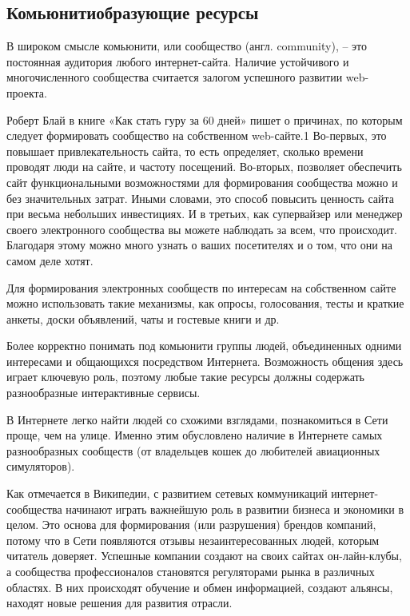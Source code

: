 \documentclass[a4paper,english,russian]{G2-105}
\begin{document}
\subsection{Комьюнитиобразующие ресурсы}
\par В широком смысле комьюнити, или сообщество (англ. community),  – это постоянная аудитория любого интернет-сайта. Наличие устойчивого и многочисленного сообщества считается залогом успешного развитии web-проекта.
\par Роберт Блай в книге «Как стать гуру за 60 дней» пишет о причинах, по которым следует формировать сообщество на собственном web-сайте.1 Во-первых, это повышает привлекательность сайта, то есть определяет, сколько времени проводят люди на сайте, и частоту посещений. Во-вторых, позволяет обеспечить сайт функциональными возможностями для формирования сообщества можно и без значительных затрат. Иными словами, это способ повысить ценность сайта при весьма небольших инвестициях. И в третьих, как супервайзер или менеджер своего электронного сообщества вы можете наблюдать за всем, что происходит. Благодаря этому можно много узнать о ваших посетителях и о том, что они на самом деле хотят.
\par Для формирования электронных сообществ по интересам на собственном сайте можно использовать такие механизмы, как опросы, голосования, тесты и краткие анкеты, доски объявлений, чаты и гостевые книги и др.
\par Более корректно понимать под комьюнити группы людей, объединенных одними интересами и общающихся посредством Интернета. Возможность общения здесь играет ключевую роль, поэтому любые такие ресурсы должны содержать разнообразные интерактивные сервисы.
\par В Интернете легко найти людей со схожими взглядами, познакомиться в Сети проще, чем на улице. Именно этим обусловлено наличие в Интернете самых разнообразных сообществ (от владельцев кошек до любителей авиационных симуляторов).
\par Как отмечается в Википедии, с развитием сетевых коммуникаций интернет-сообщества начинают играть важнейшую роль в развитии бизнеса и экономики в целом. Это основа для формирования (или разрушения) брендов компаний, потому что в Сети появляются отзывы незаинтересованных людей, которым читатель доверяет. Успешные компании создают на своих сайтах он-лайн-клубы, а сообщества профессионалов становятся регуляторами рынка в различных областях. В них происходят обучение и обмен информацией, создают альянсы, находят новые решения для развития отрасли.
\end{document}
